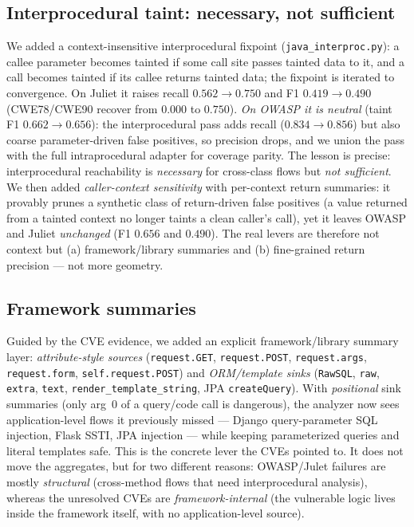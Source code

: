 \documentclass[11pt]{article}
\begin{document}
\subsection{Interprocedural taint: necessary, not sufficient}
We added a context-insensitive interprocedural fixpoint
(\texttt{java\_interproc.py}): a callee parameter becomes tainted if some call
site passes tainted data to it, and a call becomes tainted if its callee returns
tainted data; the fixpoint is iterated to convergence. On Juliet it raises recall
$0.562\to0.750$ and F1 $0.419\to0.490$ (CWE78/CWE90 recover from $0.000$ to
$0.750$). \emph{On OWASP it is neutral} (taint F1 $0.662\to0.656$): the
interprocedural pass adds recall ($0.834\to0.856$) but also coarse
parameter-driven false positives, so precision drops, and we union the pass with
the full intraprocedural adapter for coverage parity. The lesson is precise:
interprocedural reachability is \emph{necessary} for cross-class flows but
\emph{not sufficient}. We then added \emph{caller-context sensitivity} with
per-context return summaries: it provably prunes a synthetic class of
return-driven false positives (a value returned from a tainted context no longer
taints a clean caller's call), yet it leaves OWASP and Juliet \emph{unchanged}
(F1 $0.656$ and $0.490$). The real levers are therefore not context but
(a) framework/library summaries and (b) fine-grained return precision --- not more
geometry.

\subsection{Framework summaries}
Guided by the CVE evidence, we added an explicit framework/library summary layer:
\emph{attribute-style sources} (\texttt{request.GET}, \texttt{request.POST},
\texttt{request.args}, \texttt{request.form}, \texttt{self.request.POST}) and
\emph{ORM/template sinks} (\texttt{RawSQL}, \texttt{raw}, \texttt{extra},
\texttt{text}, \texttt{render\_template\_string}, JPA \texttt{createQuery}). With
\emph{positional} sink summaries (only arg~0 of a query/code call is dangerous),
the analyzer now sees application-level flows it previously missed --- Django
query-parameter SQL injection, Flask SSTI, JPA injection --- while keeping
parameterized queries and literal templates safe. This is the concrete lever the
CVEs pointed to. It does not move the aggregates, but for two different reasons:
OWASP/Julet failures are mostly \emph{structural} (cross-method flows that need
interprocedural analysis), whereas the unresolved CVEs are \emph{framework-internal}
(the vulnerable logic lives inside the framework itself, with no
application-level source).
\end{document}
